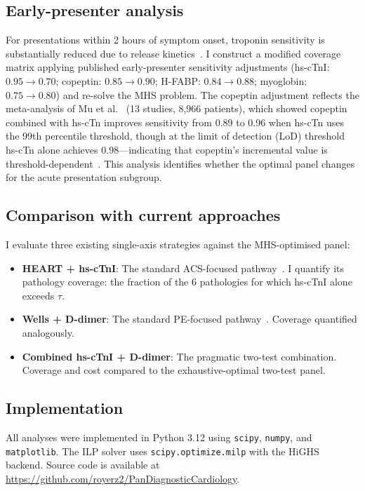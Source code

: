 \documentclass[times, twoside, watermark]{zHenriquesLab-StyleBioRxiv}
\begin{document}
\subsection*{Early-presenter analysis}

For presentations within 2 hours of symptom onset, troponin sensitivity is substantially reduced due to release kinetics~\cite{Lipinski2015}. I construct a modified coverage matrix applying published early-presenter sensitivity adjustments (hs-cTnI: $0.95 \to 0.70$; copeptin: $0.85 \to 0.90$; H-FABP: $0.84 \to 0.88$; myoglobin: $0.75 \to 0.80$) and re-solve the MHS problem. The copeptin adjustment reflects the meta-analysis of Mu et al.~\cite{Mu2023} (13 studies, 8,966 patients), which showed copeptin combined with hs-cTn improves sensitivity from 0.89 to 0.96 when hs-cTn uses the 99th percentile threshold, though at the limit of detection (LoD) threshold hs-cTn alone achieves 0.98---indicating that copeptin's incremental value is threshold-dependent~\cite{Giannitsis2021}. This analysis identifies whether the optimal panel changes for the acute presentation subgroup.

\subsection*{Comparison with current approaches}

I evaluate three existing single-axis strategies against the MHS-optimised panel:
\begin{itemize}
\item \textbf{HEART + hs-cTnI}: The standard ACS-focused pathway~\cite{Six2008,Willemsen2021}. I quantify its pathology coverage: the fraction of the 6 pathologies for which hs-cTnI alone exceeds $\tau$.
\item \textbf{Wells + D-dimer}: The standard PE-focused pathway~\cite{Wells2000,Geersing2012}. Coverage quantified analogously.
\item \textbf{Combined hs-cTnI + D-dimer}: The pragmatic two-test combination. Coverage and cost compared to the exhaustive-optimal two-test panel.
\end{itemize}

\subsection*{Implementation}

All analyses were implemented in Python 3.12 using \texttt{scipy}, \texttt{numpy}, and \texttt{matplotlib}. The ILP solver uses \texttt{scipy.optimize.milp} with the HiGHS backend. Source code is available at \url{https://github.com/royerz2/PanDiagnosticCardiology}.
\end{document}
